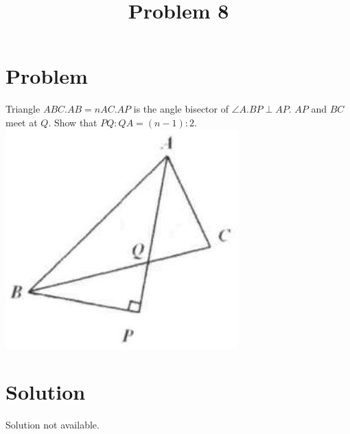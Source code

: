 \documentclass{article}
\title{Problem 8}
\date{}
\begin{document}
\maketitle

\section*{Problem}
Triangle \(A B C . A B=n A C . A P\) is the angle bisector of \(\angle A . B P \perp A P\). \(A P\) and \(B C\) meet at \(Q\). Show that \(P Q: Q A=(n-1): 2\).\\
\centering
\includegraphics[width=\textwidth]{images/127(4).jpg}

\section*{Solution}
Solution not available.
\end{document}
